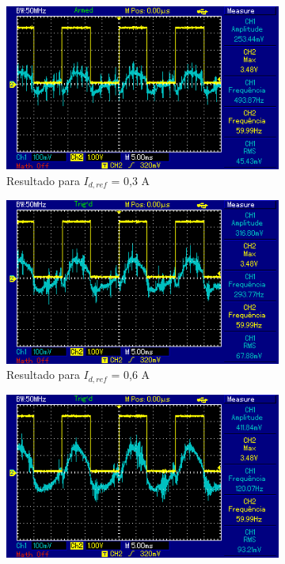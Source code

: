 \begin{figure}[!hbt]
	\centering
	\begin{subfigure}[b]{0.49\textwidth}
		\centering
		\includegraphics[width=\textwidth]{figuras/resultados_controle_corrente_0_3.png}
		\caption{Resultado para $I_{d,ref}$ = 0,3 A}
	\end{subfigure}
	\begin{subfigure}[b]{0.49\textwidth}
		\centering
		\includegraphics[width=\textwidth]{figuras/resultados_controle_corrente_0_6.png}
		\caption{Resultado para $I_{d,ref}$ = 0,6 A}
	\end{subfigure}
	\begin{subfigure}[b]{0.49\textwidth}
		\centering
		\includegraphics[width=\textwidth]{figuras/resultados_controle_corrente_0_9.png}

\end{subfigure}
\end{figure}
